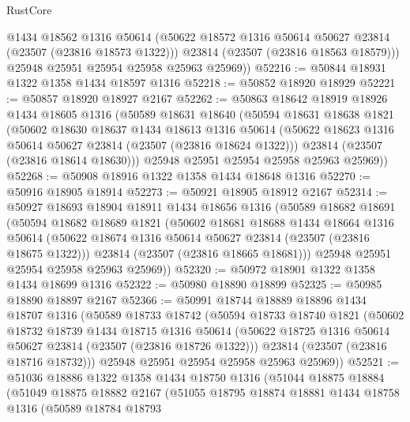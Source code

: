 \begin{lexlean}{RustCore}
\begin{coremodule}
          @1434
          @18562
          @1316
          @50614
          (@50622 @18572 @1316 @50614 @50627 @23814 (@23507 (@23816 @18573 @1322)))
          @23814
          (@23507 (@23816 @18563 @18579)))
        @25948
        @25951
        @25954
        @25958
        @25963
        @25969))
@52216 := @50844 @18931 @1322 @1358 @1434 @18597 @1316
@52218 := @50852 @18920 @18929
@52221 := @50857 @18920 @18927 @2167
@52262 := @50863
    @18642
    @18919
    @18926
    @1434
    @18605
    @1316
    (@50589
      @18631
      @18640
      (@50594
        @18631
        @18638
        @1821
        (@50602
          @18630
          @18637
          @1434
          @18613
          @1316
          @50614
          (@50622 @18623 @1316 @50614 @50627 @23814 (@23507 (@23816 @18624 @1322)))
          @23814
          (@23507 (@23816 @18614 @18630)))
        @25948
        @25951
        @25954
        @25958
        @25963
        @25969))
@52268 := @50908 @18916 @1322 @1358 @1434 @18648 @1316
@52270 := @50916 @18905 @18914
@52273 := @50921 @18905 @18912 @2167
@52314 := @50927
    @18693
    @18904
    @18911
    @1434
    @18656
    @1316
    (@50589
      @18682
      @18691
      (@50594
        @18682
        @18689
        @1821
        (@50602
          @18681
          @18688
          @1434
          @18664
          @1316
          @50614
          (@50622 @18674 @1316 @50614 @50627 @23814 (@23507 (@23816 @18675 @1322)))
          @23814
          (@23507 (@23816 @18665 @18681)))
        @25948
        @25951
        @25954
        @25958
        @25963
        @25969))
@52320 := @50972 @18901 @1322 @1358 @1434 @18699 @1316
@52322 := @50980 @18890 @18899
@52325 := @50985 @18890 @18897 @2167
@52366 := @50991
    @18744
    @18889
    @18896
    @1434
    @18707
    @1316
    (@50589
      @18733
      @18742
      (@50594
        @18733
        @18740
        @1821
        (@50602
          @18732
          @18739
          @1434
          @18715
          @1316
          @50614
          (@50622 @18725 @1316 @50614 @50627 @23814 (@23507 (@23816 @18726 @1322)))
          @23814
          (@23507 (@23816 @18716 @18732)))
        @25948
        @25951
        @25954
        @25958
        @25963
        @25969))
@52521 := @51036
    @18886
    @1322
    @1358
    @1434
    @18750
    @1316
    (@51044
      @18875
      @18884
      (@51049
        @18875
        @18882
        @2167
        (@51055
          @18795
          @18874
          @18881
          @1434
          @18758
          @1316
          (@50589
            @18784
            @18793

\end{coremodule}
\end{lexlean}
